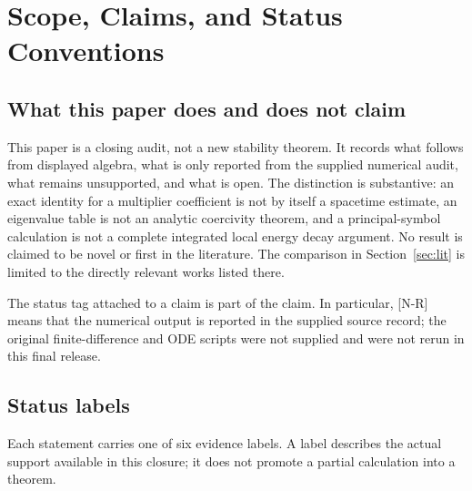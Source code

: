 \documentclass[11pt,a4paper]{article}
\theoremstyle{remark}
\theoremstyle{definition}
\begin{document}
\vspace{-2mm}
\begingroup\footnotesize
\tableofcontents
\endgroup
\clearpage
\section{Scope, Claims, and Status Conventions}

\subsection{What this paper does and does not claim}

This paper is a closing audit, not a new stability theorem. It records what follows from displayed algebra, what is only reported from the supplied numerical audit, what remains unsupported, and what is open. The distinction is substantive: an exact identity for a multiplier coefficient is not by itself a spacetime estimate, an eigenvalue table is not an analytic coercivity theorem, and a principal-symbol calculation is not a complete integrated local energy decay argument. No result is claimed to be novel or first in the literature. The comparison in Section~\ref{sec:lit} is limited to the directly relevant works listed there.

The status tag attached to a claim is part of the claim. In particular, [N-R] means that the numerical output is reported in the supplied source record; the original finite-difference and ODE scripts were not supplied and were not rerun in this final release.

\subsection{Status labels}

Each statement carries one of six evidence labels. A label describes the actual support available in this closure; it does not promote a partial calculation into a theorem.
\end{document}
